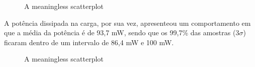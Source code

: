 \documentclass[
  number,
  preprint]{elsarticle}
\begin{document}
\begin{figure}


\caption{\label{fig-efficiency-points}A meaningless scatterplot}

\end{figure}%

A potência dissipada na carga, por sua vez, apresenteou um comportamento
em que a média da potência é de 93,7 mW, sendo que os 99,7\% das
amostras (3\(\sigma\)) ficaram dentro de um intervalo de 86,4 mW e 100
mW.

\begin{figure}


\caption{\label{fig-power-points}A meaningless scatterplot}

\end{figure}%
\end{document}
